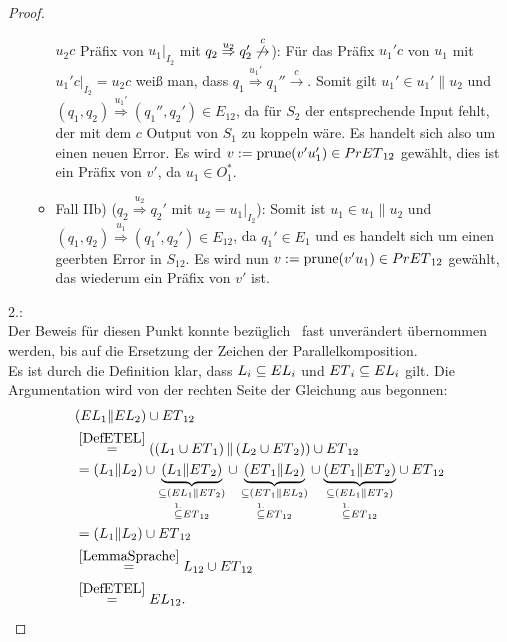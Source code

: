\begin{proof}
\begin{itemize}
\begin{itemize}
        $u_2c$ Präfix von $u_1|_{I_2}$ mit $q_2 \overset{u_2}{\Rightarrow} q_2'
        \overset{c}{\not{\hspace{-0.1cm}\rightarrow}}$\Big): Für das Präfix $u_1'c$
        von $u_1$ mit $u_1'c|_{I_2}=u_2c$ weiß man, dass $q_1
        \overset{u_1'}{\Rightarrow} q_1'' \overset{c}{\rightarrow}$. Somit gilt
        $u_1'\in u_1'\|u_2$ und $(q_1,q_2) \overset{u_1'}{\Rightarrow}
        (q_1'',q_2')\in E_{12}$, da für $S_2$ der entsprechende Input fehlt,
        der mit dem $c$ Output von $S_1$ zu koppeln wäre. Es handelt sich also
        um einen neuen Error. Es wird $v:=\mathrm{prune}{}(v'u_1')\in PrET{}_{12}$ gewählt,
        dies ist ein Präfix von $v'$, da $u_1\in O_1^*$.
      \item Fall IIb) \big($q_2 \overset{u_2}{\Rightarrow} q_2'$ mit
        $u_2=u_1|_{I_2}$\big): Somit ist $u_1\in u_1\|u_2$ und $(q_1,q_2)
        \overset{u_1}{\Rightarrow} (q_1',q_2')\in E_{12}$, da $q_1'\in E_1$ und
        es handelt sich um einen geerbten Error in $S_{12}$. Es wird nun $v:=\mathrm{prune}{}
        (v'u_1)\in PrET{}_{12}$ gewählt, das wiederum ein Präfix von $v'$ ist.
    \end{itemize}
  \end{itemize}

  2.:\\
  Der Beweis für diesen Punkt konnte bezüglich~\cite{Vogler2014EIO} fast
  unverändert übernommen werden, bis auf die Ersetzung der Zeichen der
  Parallelkomposition.\\
  Es ist durch die Definition klar, dass $L_i\subseteq EL{}_i$ und
  $ET{}_i\subseteq EL{}_i$ gilt. Die Argumentation wird von der rechten
  Seite der Gleichung aus begonnen:
  \begin{align*}
    &(EL{}_1\| EL{}_2)\cup ET{}_{12}\\
    &\overset{\ref{DefETEL}}{=}\left(\left(L_1\cup
  ET{}_1\right)\|\left(L_2\cup ET{}_2\right)\right)\cup ET{}_{12}\\
    &=(L_1\|L_2) \cup \underset{\overset{1.}{\subseteq} ET{}_{12}}{\underset{\subseteq
    (EL{}_1\|ET{}_2)}{\underbrace{(L_1\|ET{}_2)}}} \cup
    \underset{\overset{1.}{\subseteq} ET{}_{12}}{\underset{\subseteq
    (ET{}_1\|EL{}_2)}{\underbrace{(ET{}_1\|L_2)}}} \cup
     \underset{\overset{1.}{\subseteq}
    ET{}_{12}}{\underset{\subseteq (EL{}_1\|ET{}_2)}{\underbrace{(ET{}_1\|ET{}_2)}}} \cup
    ET{}_{12}\\
    &=(L_1\|L_2) \cup ET{}_{12}\\
    &\overset{\ref{LemmaSprache}}{=}L_{12}\cup ET{}_{12}\\
    &\overset{\ref{DefETEL}}{=}EL{}_{12}.
  \end{align*}
\end{proof}

